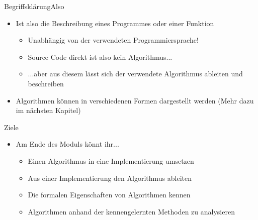 \begin{frame}{Begriffsklärung}{Also}
    \begin{itemize}[<+->]
        \item Ist also die Beschreibung eines Programmes oder einer Funktion
        \begin{itemize}
            \item Unabhängig von der verwendeten Programmiersprache!
            \item Source Code direkt ist also kein Algorithmus...
            \item ...aber aus diesem lässt sich der verwendete Algorithmus ableiten und beschreiben
        \end{itemize}
        \item Algorithmen können in verschiedenen Formen dargestellt werden (Mehr dazu im nächsten Kapitel)
    \end{itemize}
\end{frame}


\begin{frame}{Ziele}{}
    \begin{itemize}[<+->]
        \item Am Ende des Moduls könnt ihr...
        \begin{itemize}
            \item Einen Algorithmus in eine Implementierung umsetzen
            \item Aus einer Implementierung den Algorithmus ableiten
            \item Die formalen Eigenschaften von Algorithmen kennen
            \item Algorithmen anhand der kennengelernten Methoden zu analysieren
        \end{itemize}
    \end{itemize}
\end{frame}